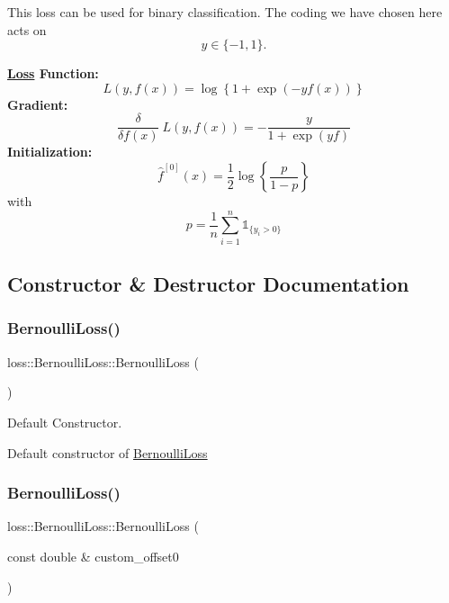 This loss can be used for binary classification. The coding we have chosen here acts on \[ y \in \{-1, 1\}. \]

{\bfseries \mbox{\hyperlink{classloss_1_1_loss}{Loss}} Function\+:} \[ L(y, f(x)) = \log\left\{1 + \exp\left(-yf(x)\right)\right\} \] {\bfseries Gradient\+:} \[ \frac{\delta}{\delta f(x)}\ L(y, f(x)) = - \frac{y}{1 + \exp\left(yf\right)} \] {\bfseries Initialization\+:} \[ \hat{f}^{[0]}(x) = \frac{1}{2}\log\left\{\frac{p}{1 - p}\right\} \] with \[ p = \frac{1}{n}\sum\limits_{i=1}^n\mathbb{1}_{\{y_i > 0\}} \] 

\subsection{Constructor \& Destructor Documentation}
\mbox{\label{classloss_1_1_bernoulli_loss_a34a87f0a059b9d7346816a20818a8ac1}} 
\subsubsection{\texorpdfstring{Bernoulli\+Loss()}{BernoulliLoss()}\hspace{0.1cm}{\footnotesize\ttfamily [1/2]}}
{\footnotesize\ttfamily loss\+::\+Bernoulli\+Loss\+::\+Bernoulli\+Loss (\begin{DoxyParamCaption}{ }\end{DoxyParamCaption})}



Default Constructor. 

Default constructor of {\ttfamily \mbox{\hyperlink{classloss_1_1_bernoulli_loss}{Bernoulli\+Loss}}} \mbox{\label{classloss_1_1_bernoulli_loss_afc952349e055f2cd8058015960619cc8}} 
\subsubsection{\texorpdfstring{Bernoulli\+Loss()}{BernoulliLoss()}\hspace{0.1cm}{\footnotesize\ttfamily [2/2]}}
{\footnotesize\ttfamily loss\+::\+Bernoulli\+Loss\+::\+Bernoulli\+Loss (\begin{DoxyParamCaption}\item[{const double \&}]{custom\+\_\+offset0 }\end{DoxyParamCaption})}



